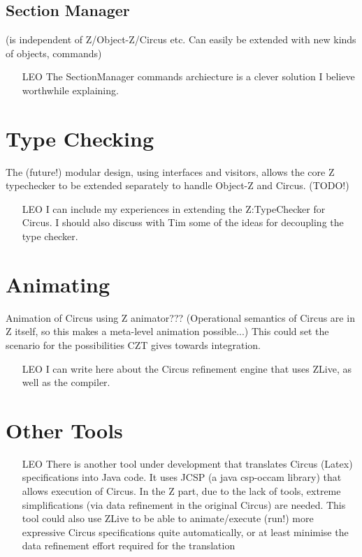 \documentclass{llncs}
\begin{document}
\subsection{Section Manager}

  (is independent of Z/Object-Z/Circus etc.
  Can easily be extended with new kinds of objects, commands)

    \begin{itemize}
        \item[LEO] The SectionManager commands archiecture is a clever solution I believe worthwhile explaining.
    \end{itemize}

\section{Type Checking}

      The (future!) modular design, using interfaces and visitors,
      allows the core Z typechecker to be extended separately
      to handle Object-Z and Circus.  (TODO!)

    \begin{itemize}
        \item[LEO] I can include my experiences in extending the Z:TypeChecker for Circus.
                    I should also discuss with Tim some of the ideas for decoupling the type checker.
    \end{itemize}

\section{Animating}

    Animation of Circus using Z animator???
      (Operational semantics of Circus are in Z itself, so this makes a meta-level animation possible...)
    This could set the scenario for the possibilities CZT gives towards integration.

    \begin{itemize}
        \item[LEO] I can write here about the Circus refinement engine that uses ZLive, as well as the compiler.
    \end{itemize}


\section{Other Tools}

    \begin{itemize}
        \item[LEO]
        There is another tool under development that translates Circus (Latex) specifications into Java code.
        It uses JCSP (a java csp-occam library) that allows execution of Circus.
        In the Z part, due to the lack of tools, extreme simplifications (via data refinement in the original Circus)
        are needed.
        This tool could also use ZLive to be able to animate/execute (run!) more expressive Circus specifications quite
        automatically, or at least minimise the data refinement effort required for the translation
    \end{itemize}
\end{document}
